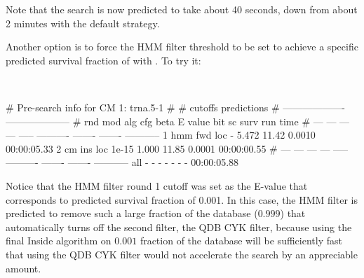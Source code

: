 Note that the search is now predicted to take about 40 seconds, down
from about 2 minutes with the default strategy.

Another option is to force the HMM filter threshold to be set to
achieve a specific predicted survival fraction of  with
. To try it:

\\

\begin{sreoutput}
# Pre-search info for CM 1: trna.5-1
#
#                                  cutoffs            predictions     
#                            -------------------  --------------------
# rnd  mod  alg  cfg   beta     E value   bit sc     surv     run time
# ---  ---  ---  ---  -----  ----------  -------  -------  -----------
    1  hmm  fwd  loc      -       5.472    11.42   0.0010  00:00:05.33
    2   cm  ins  loc  1e-15       1.000    11.85   0.0001  00:00:00.55
# ---  ---  ---  ---  -----  ----------  -------  -------  -----------
  all    -    -    -      -           -        -        -  00:00:05.88
\end{sreoutput}

Notice that the HMM filter round 1 cutoff was set as the E-value that
corresponds to predicted survival fraction of 0.001. In this case, the
HMM filter is predicted to remove such a large fraction of the
database ($0.999$) that  automatically turns off the
second filter, the QDB CYK filter, because using the final Inside
algorithm on $0.001$ fraction of the database will be sufficiently
fast that using the QDB CYK filter would not accelerate the search by an 
appreciable amount.


